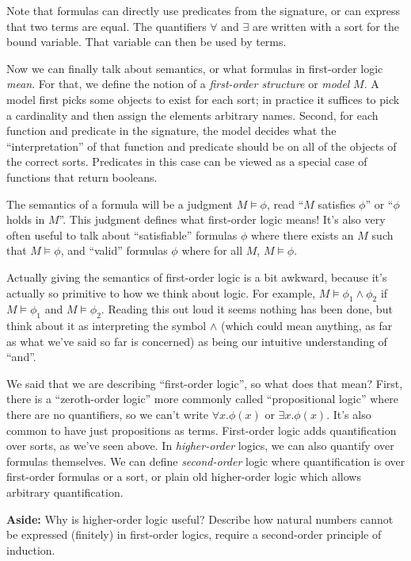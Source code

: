 \documentclass{scrbook}
\begin{document}
Note that formulas can directly use predicates from the signature, or can
express that two terms are equal. The quantifiers $\forall$ and $\exists$ are
written with a sort for the bound variable. That variable can then be used by
terms.

Now we can finally talk about semantics, or what formulas in first-order logic
\emph{mean}. For that, we define the notion of a \emph{first-order structure} or
\emph{model} $M$. A model first picks some objects to exist for each sort; in
practice it suffices to pick a cardinality and then assign the elements
arbitrary names. Second, for each function and predicate in the signature, the
model decides what the ``interpretation'' of that function and predicate should
be on all of the objects of the correct sorts. Predicates in this case can be
viewed as a special case of functions that return booleans.

The semantics of a formula will be a judgment $M \models \phi$, read ``$M$
satisfies $\phi$'' or ``$\phi$ holds in $M$''. This judgment defines what
first-order logic means! It's also very often useful to talk about
``satisfiable'' formulas $\phi$ where there exists an $M$ such that
$M \models \phi$, and ``valid'' formulas $\phi$ where for all $M$,
$M \models \phi$.

Actually giving the semantics of first-order logic is a bit awkward, because
it's actually so primitive to how we think about logic. For example,
$M \models \phi_1 \land \phi_2$ if $M \models \phi_1$ and $M \models \phi_2$.
Reading this out loud it seems nothing has been done, but think about it as
interpreting the symbol $\land$ (which could mean anything, as far as what we've
said so far is concerned) as being our intuitive understanding of ``and''.

We said that we are describing ``first-order logic'', so what does that mean?
First, there is a ``zeroth-order logic'' more commonly called ``propositional
logic'' where there are no quantifiers, so we can't write $\forall x. \phi(x)$
or $\exists x. \phi(x)$. It's also common to have just propositions as terms.
First-order logic adds quantification over sorts, as we've seen above. In
\emph{higher-order} logics, we can also quantify over formulas themselves. We
can define \emph{second-order} logic where quantification is over first-order
formulas or a sort, or plain old higher-order logic which allows arbitrary
quantification.

\textbf{Aside:} Why is higher-order logic useful? Describe how natural numbers
cannot be expressed (finitely) in first-order logics, require a second-order
principle of induction.
\end{document}
